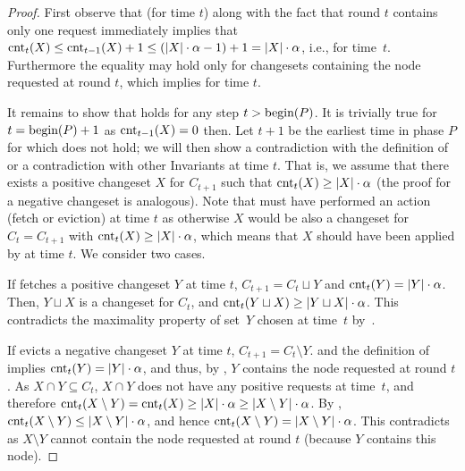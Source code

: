 \begin{proof}
First observe that  (for time $t$) along with the
fact that round $t$ contains only one request immediately implies that
$\textrm{cnt}_t(X) \leq \textrm{cnt}_{t-1}(X) + 1 \leq (|X| \cdot \alpha - 1) + 1 = |X|
\cdot \alpha$, i.e.,  for time~$t$. Furthermore the equality may
hold only for changesets containing the node requested at round $t$, which
implies  for time $t$.

It remains to show that  holds for any step $t >
\textrm{begin}(P)$. It is trivially true for $t = \textrm{begin}(P)+1$ 
as $\textrm{cnt}_{t-1}(X) = 0$ then. Let $t+1$ be the earliest time in phase $P$ for
which  does not hold; we will then show a
contradiction with the definition of \ALG or a contradiction with other
Invariants at time $t$. That is, we assume that there exists a positive
changeset $X$ for $C_{t+1}$ such that $\textrm{cnt}_t(X) \geq |X| \cdot \alpha$ (the
proof for a negative changeset is analogous). Note that \ALG must have
performed an action (fetch or eviction) at time $t$ as otherwise $X$ would be
also  a changeset for $C_t = C_{t+1}$ with $\textrm{cnt}_t(X) \geq |X| \cdot \alpha$,
which means that $X$ should have been applied by \ALG at time $t$. We consider
two cases.

If \ALG fetches a positive changeset $Y$ at time $t$, $C_{t+1} = C_t \sqcup Y$
and $\textrm{cnt}_t(Y) = |Y|\cdot\alpha$. Then, $Y \sqcup X$ is a changeset for $C_t$,
and $\textrm{cnt}_t(Y \sqcup X) \geq |Y \sqcup X| \cdot \alpha$. This contradicts
the maximality property of set~$Y$ chosen at time~$t$ by~\ALG.

If \ALG evicts a negative changeset $Y$ at time $t$, $C_{t+1} = C_t \setminus
Y$.  and the definition of \ALG implies $\textrm{cnt}_t(Y) =
|Y| \cdot \alpha$, and thus, by , $Y$ contains
the node requested at round $t$. As $X \cap Y \subseteq C_t$, \mbox{$X \cap Y$} does
not have any positive requests at time~$t$, and therefore $\textrm{cnt}_t(X \setminus
Y) = \textrm{cnt}_t(X) \geq |X| \cdot \alpha \geq |X \setminus Y| \cdot \alpha$. By
, $\textrm{cnt}_t(X \setminus Y) \leq |X \setminus Y|
\cdot \alpha$, and hence $\textrm{cnt}_t(X \setminus Y) = |X \setminus Y| \cdot
\alpha$. This contradicts  as $X \setminus Y$
cannot contain the node requested at round $t$ (because $Y$ contains this
node).
\end{proof}


